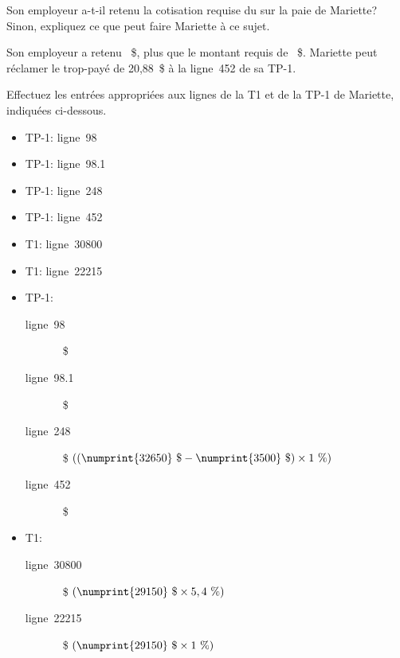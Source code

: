\begin{sousQuestion}
	Son employeur a-t-il retenu la cotisation requise du sur la paie de Mariette? Sinon, expliquez ce que peut faire Mariette à ce sujet.
\end{sousQuestion}
Son employeur a retenu ~\$, plus que le montant requis de ~\$. Mariette peut réclamer le trop-payé de 20,88~\$ à la ligne~452 de sa TP-1.

\begin{sousQuestion}
	Effectuez les entrées appropriées aux lignes de la T1 et de la TP-1 de Mariette, indiquées ci-dessous.
	\begin{itemize}
		\item TP-1: ligne~98            
		\item TP-1: ligne~98.1         
		\item TP-1: ligne~248          
		\item TP-1: ligne~452          
		\item T1: ligne~30800        
		\item T1: ligne~22215
	\end{itemize}
\end{sousQuestion}
\begin{itemize}
	\item TP-1:
	\begin{description}
		\item[ligne~98] ~\$
		\item[ligne~98.1] ~\$
		\item[ligne~248] ~\$ \medspace \( ((\numprint{32650}~\$ - \numprint{3500}~\$) \times 1~\%) \)
		\item[ligne~452] ~\$
	\end{description}
	\item T1:
	\begin{description}
		\item[ligne~30800] ~\$ \medspace \( (\numprint{29150}~\$ \times 5,4~\%) \)
		\item[ligne~22215] ~\$ \medspace \( (\numprint{29150}~\$ \times 1~\%) \)
	\end{description}	
\end{itemize}

